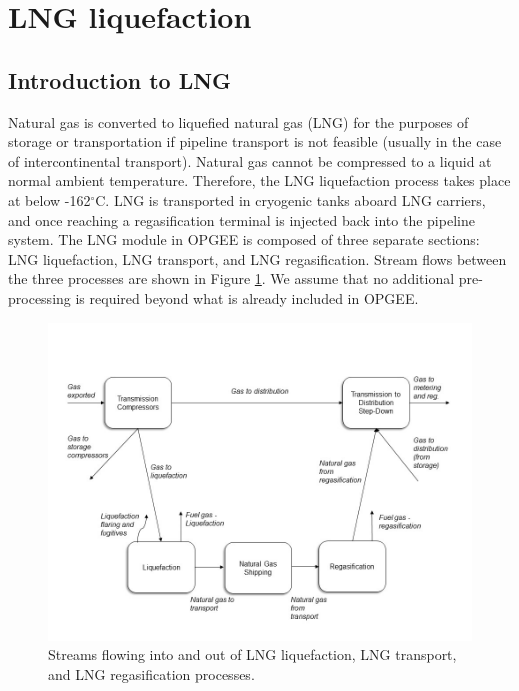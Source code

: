 \documentclass[11pt]{report}
\begin{document}
\clearpage

\section{LNG liquefaction}
\label{sec:lng_liquefaction}

\subsection{Introduction to LNG}

Natural gas is converted to liquefied natural gas (LNG) for the purposes of storage or transportation if pipeline transport is not feasible (usually in the case of intercontinental transport). Natural gas cannot be compressed to a liquid at normal ambient temperature. Therefore, the LNG liquefaction process takes place at below -162$^{\circ}$C. LNG is transported in cryogenic tanks aboard LNG carriers, and once reaching a regasification terminal is injected back into the pipeline system.
The LNG module in OPGEE is composed of three separate sections: LNG liquefaction, LNG transport, and LNG regasification. Stream flows between the three processes are shown in Figure \ref{fig:LNG_flows}. We assume that no additional pre-processing is required beyond what is already included in OPGEE.

\begin{figure}[h]
\includegraphics[width=1\columnwidth]{documentation/images/Liquefaction_flow.jpg}
\caption{Streams flowing into and out of LNG liquefaction, LNG transport, and LNG regasification processes.}
\label{fig:LNG_flows}
\end{figure}
\end{document}

